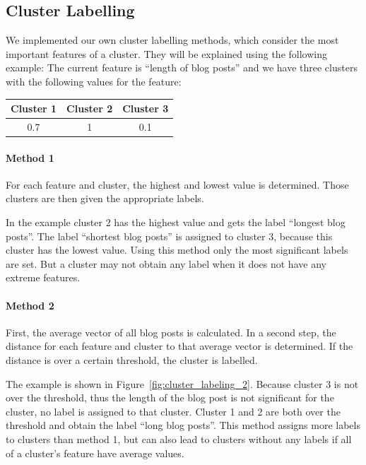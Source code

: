 \subsection{Cluster Labelling}
\label{sec:impl_cluster_labeling}

We implemented our own cluster labelling methods, which consider the most important features of a cluster.
They will be explained using the following example:
The current feature is ``length of blog posts'' and we have three clusters with the following values for the feature:
\begin{center}
\begin{tabular}{c|c|c}
  Cluster 1 & Cluster 2 & Cluster 3 \\ \hline
  0.7 & 1 & 0.1 \\
 \end{tabular}
\end{center}


\paragraph{Method 1}
For each feature and cluster, the highest and lowest value is determined.
Those clusters are then given the appropriate labels.

In the example cluster 2 has the highest value and gets the label ``longest blog posts''.
The label ``shortest blog posts'' is assigned to cluster 3, because this cluster has the lowest value.
Using this method only the most significant labels are set.
But a cluster may not obtain any label when it does not have any extreme features.


\paragraph{Method 2}
First, the average vector of all blog posts is calculated.
In a second step, the distance for each feature and cluster to that average vector is determined.
If the distance is over a certain threshold, the cluster is labelled.

The example is shown in Figure~\ref{fig:cluster_labeling_2}.
Because cluster 3 is not over the threshold, thus the length of the blog post is not significant for the cluster, no label is assigned to that cluster.
Cluster 1 and 2 are both over the threshold and obtain the label ``long blog posts''.
This method assigns more labels to clusters than method 1, but can also lead to clusters without any labels if all of a cluster's feature have average values.

